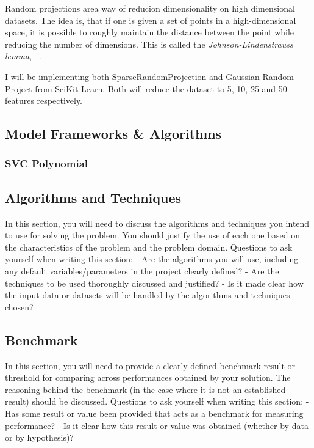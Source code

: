 \documentclass[12pt]{article}
\begin{document}
Random projections area way of reducion dimensionality on high dimensional datasets. The idea is, that if one is given a set of points in a high-dimensional space, it is possible to roughly maintain the distance between the point while reducing the number of dimensions. This is called the \emph{Johnson-Lindenstrauss lemma}, ~\cite{wiki:jll}.

I will be implementing both SparseRandomProjection and Gaussian Random Project from SciKit Learn. Both will reduce the dataset to 5, 10, 25 and 50 features respectively.


\subsection{Model Frameworks \& Algorithms}

\subsubsection{SVC Polynomial}


\subsection{Algorithms and Techniques}

In this section, you will need to discuss the algorithms and techniques you intend to use for solving the problem. You should justify the use of each one based on the characteristics of the problem and the problem domain. Questions to ask yourself when writing this section:
- Are the algorithms you will use, including any default variables/parameters in the project clearly defined?
- Are the techniques to be used thoroughly discussed and justified?
- Is it made clear how the input data or datasets will be handled by the algorithms and techniques chosen?

\subsection{Benchmark}
In this section, you will need to provide a clearly defined benchmark result or threshold for comparing across performances obtained by your solution. The reasoning behind the benchmark (in the case where it is not an established result) should be discussed. Questions to ask yourself when writing this section:
- Has some result or value been provided that acts as a benchmark for measuring performance?
- Is it clear how this result or value was obtained (whether by data or by hypothesis)?
\end{document}
